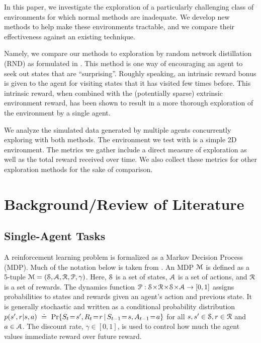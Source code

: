 \documentclass[11pt,journal,compsoc]{IEEEtran}
\begin{document}
	In this paper, we investigate the exploration of a particularly challenging class of environments for which normal methods are inadequate. We develop new methods to help make these environments tractable, and we compare their effectiveness against an existing technique.
	
	Namely, we compare our methods to exploration by random network distillation (RND) as formulated in \cite{rnd}. This method is one way of encouraging an agent to seek out states that are ``surprising''. Roughly speaking, an intrinsic reward bonus is given to the agent for visiting states that it has visited few times before. This intrinsic reward, when combined with the (potentially sparse) extrinsic environment reward, has been shown to result in a more thorough exploration of the environment by a single agent. 
	
	We analyze the simulated data generated by multiple agents concurrently exploring with both methods. The environment we test with is a simple 2D environment. The metrics we gather include a direct measure of exploration as well as the total reward received over time. We also collect these metrics for other exploration methods for the sake of comparison. 
	
	\section{Background/Review of Literature}
	\subsection{Single-Agent Tasks}
	A reinforcement learning problem is formalized as a Markov Decision Process (MDP). Much of the notation below is taken from \cite{sutton_and_barto}. An MDP ${\mathcal M}$ is defined as a 5-tuple $\M = (\S, \A, \R, \P, \gamma)$. Here, $\S$ is a set of states, $\A$ is a set of actions, and $\R$ is a set of rewards. The dynamics function $\P: \S \!\cross\! \R \!\cross\! \S \!\cross\! \A \to [0,1]$ assigns probabilities to states and rewards given an agent's action and previous state. It is generally stochastic and written as a conditional probability distribution $p(s',r|s,a)~\defeq~\Pr{S_t\!=\!s', R_t\!=\!r\,|\, S_{t-1}\!=\!s, A_{t-1}\!=\!a}$ for all $s,s' \in \S, r \in \R$ and $a \in \A$. The discount rate, $\gamma \in [0,1]$, is used to control how much the agent values immediate reward over future reward.
	
\end{document}
